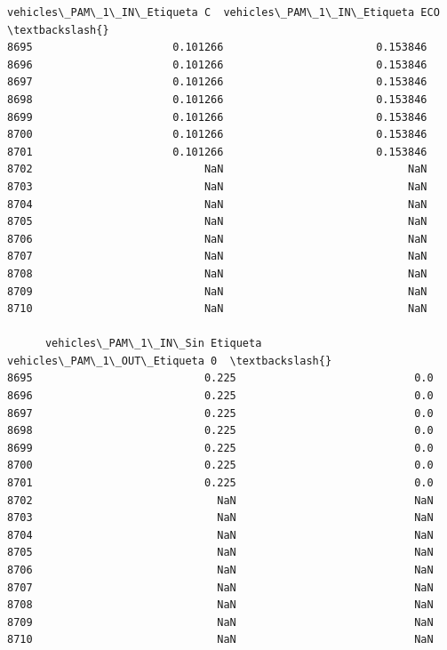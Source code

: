 \documentclass[11pt]{article}
\begin{document}
\begin{tcolorbox}[breakable, size=fbox, boxrule=.5pt, pad at break*=1mm, opacityfill=0]
\begin{Verbatim}[commandchars=\\\{\}]
      vehicles\_PAM\_1\_IN\_Etiqueta C  vehicles\_PAM\_1\_IN\_Etiqueta ECO  \textbackslash{}
8695                      0.101266                        0.153846
8696                      0.101266                        0.153846
8697                      0.101266                        0.153846
8698                      0.101266                        0.153846
8699                      0.101266                        0.153846
8700                      0.101266                        0.153846
8701                      0.101266                        0.153846
8702                           NaN                             NaN
8703                           NaN                             NaN
8704                           NaN                             NaN
8705                           NaN                             NaN
8706                           NaN                             NaN
8707                           NaN                             NaN
8708                           NaN                             NaN
8709                           NaN                             NaN
8710                           NaN                             NaN

      vehicles\_PAM\_1\_IN\_Sin Etiqueta  vehicles\_PAM\_1\_OUT\_Etiqueta 0  \textbackslash{}
8695                           0.225                            0.0
8696                           0.225                            0.0
8697                           0.225                            0.0
8698                           0.225                            0.0
8699                           0.225                            0.0
8700                           0.225                            0.0
8701                           0.225                            0.0
8702                             NaN                            NaN
8703                             NaN                            NaN
8704                             NaN                            NaN
8705                             NaN                            NaN
8706                             NaN                            NaN
8707                             NaN                            NaN
8708                             NaN                            NaN
8709                             NaN                            NaN
8710                             NaN                            NaN


\end{Verbatim}
\end{tcolorbox}
\end{document}
